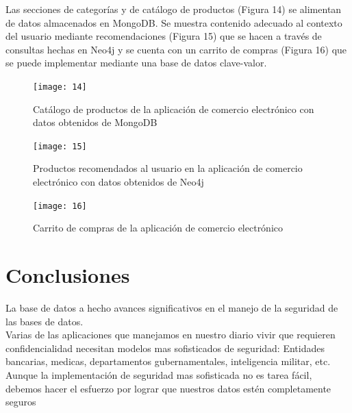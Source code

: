 \documentclass[conference]{IEEEtran}
\begin{document}
Las secciones de categor\'ias y de cat\'alogo de productos (Figura 14) se alimentan de datos almacenados en MongoDB. Se muestra contenido adecuado al contexto del usuario mediante recomendaciones (Figura 15) que se hacen a trav\'es de consultas hechas en Neo4j y se cuenta con un carrito de compras (Figura 16) que se puede implementar mediante una base de datos clave-valor.

\begin{figure}[!h]
\centering
\texttt{[image: 14]}
\caption{Cat\'alogo de productos de la aplicaci\'on de comercio electr\'onico con datos obtenidos de MongoDB}
\label{}
\end{figure}

\begin{figure}[!h]
\centering
\texttt{[image: 15]}
\caption{Productos recomendados al usuario en la aplicaci\'on de comercio electr\'onico con datos obtenidos de Neo4j}
\label{}
\end{figure}

\begin{figure}[!h]
\centering
\texttt{[image: 16]}
\caption{Carrito de compras de la aplicaci\'on de comercio electr\'onico}
\label{}
\end{figure}


\section{Conclusiones}
  La base de datos a hecho avances significativos en el manejo de la seguridad de las bases de datos.
  \\
  Varias de las aplicaciones que manejamos en nuestro diario vivir que requieren confidencialidad necesitan modelos mas sofisticados de seguridad: Entidades bancarias, medicas, departamentos gubernamentales, inteligencia militar, etc.
  \\
  Aunque la implementación de seguridad mas sofisticada no es tarea fácil, debemos hacer el esfuerzo por lograr que nuestros datos estén completamente seguros


\ifCLASSOPTIONcaptionsoff
  \newpage
\fi
\end{document}
